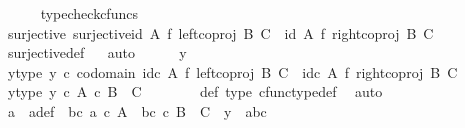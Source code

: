 \begin{isabellebody}
\ \ \ \ \isamarkupfalse%
\ typecheck{\isacharunderscore}{\kern0pt}cfuncs\isanewline
\ \ \isamarkupfalse%
\ surjective{\isacharcolon}{\kern0pt}\ {\isachardoublequoteopen}surjective{\isacharparenleft}{\kern0pt}{\isacharparenleft}{\kern0pt}id\ A\ {\isasymtimes}\isactrlsub f\ left{\isacharunderscore}{\kern0pt}coproj\ B\ C{\isacharparenright}{\kern0pt}\ {\isasymamalg}\ {\isacharparenleft}{\kern0pt}id\ A\ {\isasymtimes}\isactrlsub f\ right{\isacharunderscore}{\kern0pt}coproj\ B\ C{\isacharparenright}{\kern0pt}{\isacharparenright}{\kern0pt}{\isachardoublequoteclose}\isanewline
\ \ \ \ \isamarkupfalse%
\ surjective{\isacharunderscore}{\kern0pt}def\isanewline
\ \ \isamarkupfalse%
{\isacharparenleft}{\kern0pt}auto{\isacharparenright}{\kern0pt}\isanewline
\ \ \ \ \isamarkupfalse%
\ y\ \isanewline
\ \ \ \ \isamarkupfalse%
\ y{\isacharunderscore}{\kern0pt}type{\isacharcolon}{\kern0pt}\ {\isachardoublequoteopen}y\ {\isasymin}\isactrlsub c\ codomain\ {\isacharparenleft}{\kern0pt}{\isacharparenleft}{\kern0pt}id\isactrlsub c\ A\ {\isasymtimes}\isactrlsub f\ left{\isacharunderscore}{\kern0pt}coproj\ B\ C{\isacharparenright}{\kern0pt}\ {\isasymamalg}\ {\isacharparenleft}{\kern0pt}id\isactrlsub c\ A\ {\isasymtimes}\isactrlsub f\ right{\isacharunderscore}{\kern0pt}coproj\ B\ C{\isacharparenright}{\kern0pt}{\isacharparenright}{\kern0pt}{\isachardoublequoteclose}\isanewline
\ \ \ \ \isamarkupfalse%
\ \isamarkupfalse%
\ y{\isacharunderscore}{\kern0pt}type{}{\isacharcolon}{\kern0pt}\ {\isachardoublequoteopen}y\ {\isasymin}\isactrlsub c\ A\ {\isasymtimes}\isactrlsub c\ {\isacharparenleft}{\kern0pt}B\ {\isasymCoprod}\ C{\isacharparenright}{\kern0pt}{\isachardoublequoteclose}\isanewline
\ \ \ \ \ \ \isamarkupfalse%
\ {\isasymphi}{\isacharunderscore}{\kern0pt}def\ {\isasymphi}{\isacharunderscore}{\kern0pt}type\ cfunc{\isacharunderscore}{\kern0pt}type{\isacharunderscore}{\kern0pt}def\ \isamarkupfalse%
\ auto\isanewline
\ \ \ \ \isamarkupfalse%
\ \isamarkupfalse%
\ a\ \ a{\isacharunderscore}{\kern0pt}def{\isacharcolon}{\kern0pt}\ {\isachardoublequoteopen}{\isasymexists}\ bc{\isachardot}{\kern0pt}\ a\ {\isasymin}\isactrlsub c\ A\ {\isasymand}\ bc\ {\isasymin}\isactrlsub c\ B\ {\isasymCoprod}\ C\ {\isasymand}\ y\ {\isacharequal}{\kern0pt}\ {\isasymlangle}a{\isacharcomma}{\kern0pt}bc{\isasymrangle}{\isachardoublequoteclose}\isanewline
\ \ \ \ \ \ \isamarkupfalse%

\end{isabellebody}
